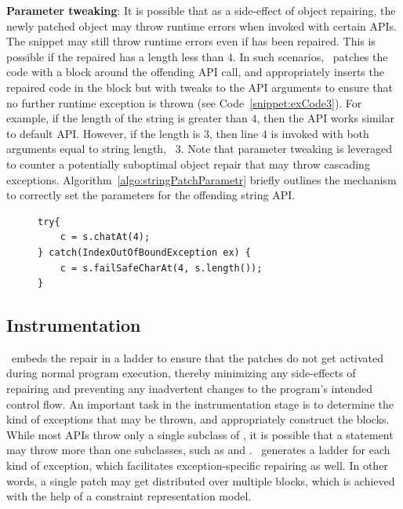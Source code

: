 \begin{mylist}
 \item \textbf{Parameter tweaking}: It is possible that as a side-effect of
object repairing, the newly patched object may throw runtime errors when invoked
with certain  APIs. The snippet  may still
throw runtime errors even if  has been repaired. This is possible if the
repaired  has a length less than $4$. In such scenarios, \tool\ patches
the code with a  block around the offending API call, and
appropriately inserts the repaired code in the  block but with
tweaks to the API arguments to ensure that no further runtime exception is
thrown (see Code~\ref{snippet:exCode3}). For example, if the length of the
string is greater than $4$, then the API works similar to default 
API. However, if the length is $3$, then line $4$ is invoked with both arguments
equal to string length, \ie\ $3$. Note that parameter tweaking is leveraged to
counter a potentially suboptimal object repair that may throw cascading
exceptions. Algorithm~\ref{algo:stringPatchParametr} briefly outlines the
mechanism to correctly set the parameters for the offending string API.

\lstset{language=Java, caption=Example of parameter tweaking.,
label = snippet:exCode3, firstnumber =1}
\begin{figure}[t]
\begin{lstlisting}
try{
    c = s.chatAt(4);
} catch(IndexOutOfBoundException ex) {
    c = s.failSafeCharAt(4, s.length());
}
\end{lstlisting}
\end{figure}
\end{mylist}


\subsection{Instrumentation}
\label{sec:tool:stage3}

\tool\ embeds the repair in a  ladder to ensure that the patches
do not get activated during normal program execution, thereby minimizing any
side-effects of repairing and preventing any inadvertent changes to the
program's intended control flow.
% 
An important task in the instrumentation stage is to determine the kind of
exceptions that may be thrown, and appropriately construct the 
blocks. While most APIs throw only a single subclass of ,
it is possible that a statement may throw more than one subclasses, such as
 and . \tool\
generates a  ladder for each kind of exception, which facilitates
exception-specific repairing as well. In other words, a single patch
may get distributed over multiple \code{catch} blocks, which is achieved with
the help of a constraint representation model.

